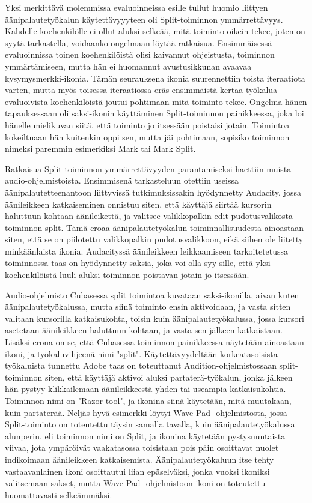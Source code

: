 \documentclass[utf8]{gradu3}
\begin{document}
Yksi merkittävä molemmissa evaluoinneissa esille tullut huomio liittyen äänipalautetyökalun käytettävyyyteen oli Split-toiminnon ymmärrettävyys. Kahdelle koehenkilölle ei ollut aluksi selkeää, mitä toiminto oikein tekee, joten on syytä tarkastella, voidaanko ongelmaan löytää ratkaisua. Ensimmäisessä evaluoinnissa toinen koehenkilöistä olisi kaivannut ohjeistusta, toiminnon ymmärtämiseen, mutta hän ei huomannut avustusikkunan avaavaa kysymysmerkki-ikonia. Tämän seurauksena ikonia suurennettiin toista iteraatiota varten, mutta myös toisessa iteraatiossa eräs ensimmäistä kertaa työkalua evaluoivista koehenkilöistä joutui pohtimaan mitä toiminto tekee. Ongelma hänen tapauksessaan oli saksi-ikonin käyttäminen Split-toiminnon painikkeessa, joka loi hänelle mielikuvan siitä, että toiminto jo itsessään poistaisi jotain. Toimintoa kokeiltuaan hän kuitenkin oppi sen, mutta jäi pohtimaan, sopisiko toiminnon nimeksi paremmin esimerkiksi Mark tai Mark Split. 

Ratkaisua Split-toiminnon ymmärrettävyyden parantamiseksi haettiin muista audio-ohjelmistoista. Ensimmisenä tarkasteluun otettiin useissa äänipalautetteenantoon liittyvissä tutkimuksissakin hyödynnetty Audacity, jossa äänileikkeen katkaiseminen onnistuu siten, että käyttäjä siirtää kursorin haluttuun kohtaan äänileikettä, ja valitsee valikkopalkin edit-pudotusvalikosta toiminnon split. Tämä eroaa äänipalautetyökalun toiminnallisuudesta ainoastaan siten, että se on piilotettu valikkopalkin pudotusvalikkoon, eikä siihen ole liitetty minkäänlaista ikonia. Audacityssä äänileikkeen leikkaamiseen tarkoitetetussa toiminnossa taas on hyödynnetty saksia, joka voi olla syy sille, että yksi koehenkilöistä luuli aluksi toiminnon poistavan jotain jo itsessään.  

Audio-ohjelmisto Cubasessa split toimintoa kuvataan saksi-ikonilla, aivan kuten äänipalautetyökalussa, mutta siinä toiminto ensin aktivoidaan, ja vasta sitten valitaan kursorilla katkaisukohta, toisin kuin äänipalautetyökalussa, jossa kursori asetetaan äänileikkeen haluttuun kohtaan, ja vasta sen jälkeen katkaistaan. Lisäksi erona on se, että Cubasessa toiminnon painikkeessa näytetään ainoastaan ikoni, ja työkaluvihjeenä nimi "split". Käytettävyydeltään korkeatasoisista työkaluista tunnettu Adobe taas on toteuttanut Audition-ohjelmistossaan split-toiminnon siten, että käyttäjä aktivoi aluksi partaterä-työkalun, jonka jälkeen hän pystyy klikkailemaan äänileikkeestä yhden tai useampia katkaisukohtia. Toiminnon nimi on "Razor tool", ja ikonina siinä käytetään, mitä muutakaan, kuin partaterää. Neljäs hyvä esimerkki löytyi Wave Pad -ohjelmistosta, jossa Split-toiminto on toteutettu täysin samalla tavalla, kuin äänipalautetyökalussa alunperin, eli toiminnon nimi on Split, ja ikonina käytetään pystysuuntaista viivaa, jota ympäröivät vaakatasossa toisistaan pois päin osoittavat nuolet indikoimaan äänileikkeen katkaisemista. Äänipalautetyökaluun itse tehty vastaavanlainen ikoni osoittautui liian epäselväksi, jonka vuoksi ikoniksi valitsemaan sakset, mutta Wave Pad -ohjelmistoon ikoni on toteutettu huomattavasti selkeämmäksi. 
\end{document}

